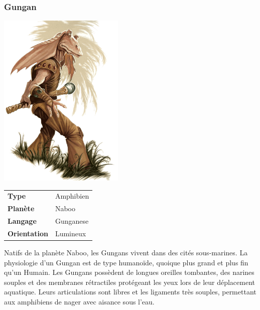 \subsubsection{Gungan}
\begin{samepage}
	\vspace{-1\baselineskip}
	\includegraphics[width=6cm]{img/personnages/races/gungan.png}
	\vspace{-12\baselineskip}

	\begin{flushright}
		\begin{tabular}{ l l }
			\textbf{Type} 			& Amphibien \\
		   	\textbf{Planète} 		& Naboo \\
		   	\textbf{Langage} 		& Gunganese \\
		   	\textbf{Orientation} 	& Lumineux \\
		\end{tabular}
	\end{flushright}

	\vspace{7\baselineskip}
\end{samepage}

Natifs de la planète Naboo, les Gungans vivent dans des cités sous-marines. La physiologie d’un Gungan est de type humanoïde, quoique plus grand et plus fin qu’un Humain. Les Gungans possèdent de longues oreilles tombantes, des narines souples et des membranes rétractiles protégeant les yeux lors de leur déplacement aquatique. Leurs articulations sont libres et les ligaments très souples, permettant aux amphibiens de nager avec aisance sous l’eau.

